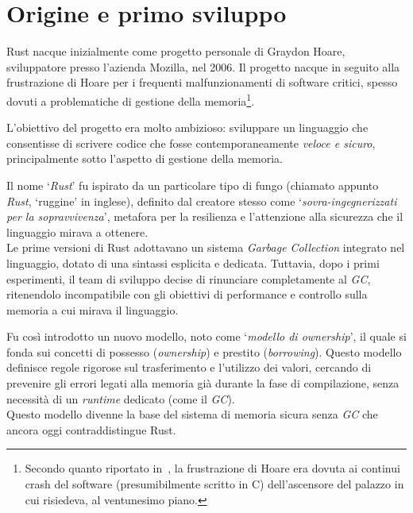 \section{Origine e primo sviluppo}
Rust nacque inizialmente come progetto personale di Graydon Hoare, sviluppatore presso l'azienda Mozilla, nel 2006.
Il progetto nacque in seguito alla frustrazione di Hoare per i frequenti malfunzionamenti di software critici, spesso dovuti 
a problematiche di gestione della memoria\footnote{Secondo quanto riportato in~\cite{rust-2023-interview}, 
la frustrazione di Hoare era dovuta ai continui crash del software (presumibilmente scritto in C) dell'ascensore del palazzo in cui risiedeva, al ventunesimo piano.}.

L'obiettivo del progetto era molto ambizioso: sviluppare un linguaggio che consentisse di scrivere codice 
che fosse contemporaneamente \textit{veloce e sicuro}, principalmente sotto l'aspetto di gestione della memoria.

Il nome `\textit{Rust}' fu ispirato da un particolare tipo di fungo (chiamato appunto \textit{Rust}, `ruggine' in inglese), definito dal creatore 
stesso come `\textit{sovra-ingegnerizzati per la sopravvivenza}', metafora per la resilienza e l'attenzione 
alla sicurezza che il linguaggio mirava a ottenere. \hfill
\vspace{10pt}\\
\noindent Le prime versioni di Rust adottavano un sistema \textit{Garbage Collection} integrato nel linguaggio, dotato di una sintassi esplicita e dedicata.
Tuttavia, dopo i primi esperimenti, il team di sviluppo decise di rinunciare completamente al \textit{GC}, ritenendolo incompatibile con gli obiettivi di performance 
e controllo sulla memoria a cui mirava il linguaggio.

Fu così introdotto un nuovo modello, noto come `\textit{modello di ownership}', il quale si fonda 
sui concetti di possesso (\textit{ownership}) e prestito (\textit{borrowing}).
Questo modello definisce regole rigorose sul trasferimento e l'utilizzo dei valori, cercando di prevenire gli errori legati 
alla memoria già durante la fase di compilazione, senza necessità di un \textit{runtime} dedicato (come il \textit{GC}). \hfill
\\
\noindent Questo modello divenne la base del sistema di memoria sicura senza \textit{GC} che ancora oggi contraddistingue Rust.

